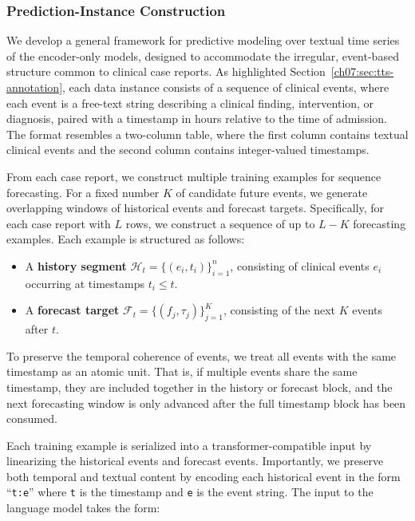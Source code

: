 \subsubsection{Prediction-Instance Construction}\label{ch07:sec:prediction-instances}

We develop a general framework for predictive modeling over textual time series of the encoder-only models, designed to accommodate the irregular, event-based structure common to clinical case reports. 
As highlighted Section~\ref{ch07:sec:tts-annotation}, each data instance consists of a sequence of clinical events, where each event is a free-text string describing a clinical finding, intervention, or diagnosis, paired with a timestamp in hours relative to the time of admission. 
The format resembles a two-column table, where the first column contains textual clinical events and the second column contains integer-valued timestamps.

From each case report, we construct multiple training examples for sequence forecasting.
For a fixed number $K$ of candidate future events, we generate overlapping windows of historical events and forecast targets.
Specifically, for each case report with $L$ rows, we construct a sequence of up to $L-K$ forecasting examples.
Each example is structured as follows:

\begin{itemize}
    \item A \textbf{history segment} $\mathcal{H}_t = \{(e_i, t_i)\}_{i=1}^{n}$, consisting of clinical events $e_i$ occurring at timestamps $t_i \leq t$.
    \item A \textbf{forecast target} $\mathcal{F}_t = \{(f_j, \tau_j)\}_{j=1}^{K}$, consisting of the next $K$ events after $t$.
\end{itemize}

To preserve the temporal coherence of events, we treat all events with the same timestamp as an atomic unit.
That is, if multiple events share the same timestamp, they are included together in the history or forecast block, and the next forecasting window is only advanced after the full timestamp block has been consumed.

Each training example is serialized into a transformer-compatible input by linearizing the historical events and forecast events.
Importantly, we preserve both temporal and textual content by encoding each historical event in the form ``\texttt{t:e}'' where \texttt{t} is the timestamp and \texttt{e} is the event string.
The input to the language model takes the form:

